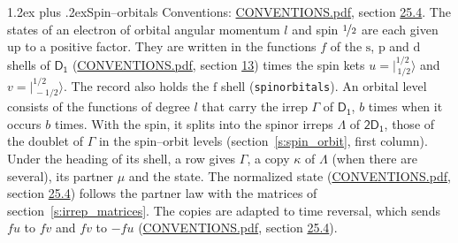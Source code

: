 \documentclass[10pt,a4paper]{article}
\makeatletter
\renewcommand\section{\@startsection{section}{1}{\z@}{-3ex plus -1ex minus -.2ex}%
  {1.2ex plus .2ex}{\normalfont\large\sffamily\bfseries\color{parttitle}}}
\numberwithin{equation}{section}
\newcommand{\grp}[1]{\mathsf{#1}}
\newcommand{\orbital}[1]{\mathrm{#1}}
\newcommand{\mult}{\kappa}
\newcommand{\intx}{\mu}
\newcommand{\jm}[2]{\bigl\lvert{}^{#1}_{\,#2}\bigr\rangle}
\makeatother
\begin{document}
\section{Spin--orbitals}\label{s:spin_orbitals}
Conventions: \href{../../CONVENTIONS.pdf}{CONVENTIONS.pdf}, section \href{../../CONVENTIONS.pdf\#conv.25.4}{25.4}.
\leavevmode\label{n:index.orbital.l}The states of an electron of orbital angular momentum $l$ and spin $\nicefrac{1}{2}$ are each given up to a positive factor. \label{n:local.spinor.uv}\label{n:local.function.f}They are written in the functions $f$ of the $\orbital{s}$, $\orbital{p}$ and $\orbital{d}$ shells of \href{../../../rotation/data/pdf/D1.pdf}{$\grp{D_{1}}$} (\href{../../CONVENTIONS.pdf}{CONVENTIONS.pdf}, section \href{../../../rotation/CONVENTIONS.pdf\#conv.13}{13}) times the spin kets $u = \jm{1/2}{1/2}$ and $v = \jm{1/2}{-1/2}$. The record also holds the $\orbital{f}$ shell (\texttt{spinorbitals}). An orbital level consists of the functions of degree $l$ that carry the irrep $\Gamma$ of \href{../../../rotation/data/pdf/D1.pdf}{$\grp{D_{1}}$}, $b$ times when it occurs $b$ times. With the spin, it splits into the spinor irreps $\Lambda$ of $\grp{2D_{1}}$, those of the doublet of $\Gamma$ in the spin--orbit levels (section~\ref{s:spin_orbit}, first column). \label{n:head.state}Under the heading of its shell, a row gives $\Gamma$, a copy $\mult$ of $\Lambda$ (when there are several), its partner $\intx$ and the state. The normalized state (\href{../../CONVENTIONS.pdf}{CONVENTIONS.pdf}, section \href{../../CONVENTIONS.pdf\#conv.25.4}{25.4}) follows the partner law with the matrices of section~\ref{s:irrep_matrices}. The copies are adapted to time reversal, which sends $f u$ to $f v$ and $f v$ to $-f u$ (\href{../../CONVENTIONS.pdf}{CONVENTIONS.pdf}, section \href{../../CONVENTIONS.pdf\#conv.25.4}{25.4}).
\end{document}
